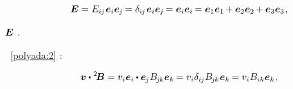 \nopagebreak\vspace{-0.2em}\begin{equation*}
\bm{E} =
E_{i\hspace{-0.1ex}j} \hspace{.16ex} \bm{e}_i \bm{e}_{\hspace{-0.1ex}j} \hspace{-0.2ex} =
\delta_{i\hspace{-0.1ex}j} \hspace{.16ex} \bm{e}_i \bm{e}_{\hspace{-0.1ex}j} \hspace{-0.2ex} =
\bm{e}_i \bm{e}_i \hspace{-0.2ex} =
\bm{e}_1 \bm{e}_1 \hspace{-0.2ex} + \bm{e}_2 \bm{e}_2 \hspace{-0.2ex} + \bm{e}_3 \bm{e}_3
\hspace{.1ex} ,
\end{equation*}

\vspace{-0.2em}\nopagebreak\noindent
{}
${\hspace{-0.15ex}\bm{E}}$
.

 ~\eqref{polyada:2}  
:

\nopagebreak\vspace{-0.2em}\begin{equation*}
\bm{v} \dotp {^2\!\bm{B}} =
v_i\bm{e}_i
\hspace{-0.1ex} \dotp
\bm{e}_{\hspace{-0.1ex}j}
B_{\hspace{-0.2ex}j\hspace{-0.1ex}k}
\bm{e}_k \hspace{-0.2ex}
= v_i
\delta_{i\hspace{-0.1ex}j}
B_{\hspace{-0.2ex}j\hspace{-0.1ex}k} \hspace{.1ex}
\bm{e}_k \hspace{-0.2ex}
= v_i
B_{ik}
\bm{e}_k
\hspace{.1ex} ,
\end{equation*}

